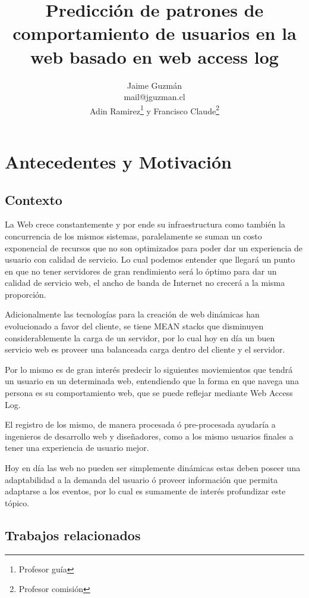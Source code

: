 \documentclass{udparticle}
\title{ Predicción de patrones de comportamiento de usuarios en la web basado en web access log}
\author{  
  Jaime Guzmán\\{\small\ttfamily mail@jguzman.cl}\protect\\[5pt]%
  {\small Adin Ramirez\thanks{Profesor guía} y Francisco Claude\thanks{Profesor comisión}}%
  }
\begin{document}
\maketitle

\section{Antecedentes y Motivación}

\subsection{Contexto}


  La Web crece constantemente y por ende su infraestructura como también la concurrencia de los mismos sistemas, paralelamente se suman un costo exponencial de recursos que no son optimizados para poder dar un experiencia de usuario con calidad de servicio.
  Lo cual podemos entender que llegará un punto en que no tener servidores de gran rendimiento será lo óptimo para dar un calidad de servicio web, el ancho de banda de Internet no crecerá a la misma proporción.


  Adicionalmente las tecnologías para la creación de  web dinámicas han evolucionado a favor del cliente, se tiene MEAN stacks que disminuyen considerablemente la carga de un servidor, por lo cual hoy en día un buen servicio web  es proveer una balanceada carga dentro del cliente y el servidor.

  Por lo mismo es de gran interés predecir lo siguientes moviemientos que tendrá un usuario en un determinada web, entendiendo que la forma en que navega una persona es su comportamiento web, que se puede reflejar mediante Web Access Log.

  El registro de los mismo, de manera procesada ó pre-procesada ayudaría a ingenieros de desarrollo web y diseñadores, como a los mismo usuarios finales a tener una experiencia de usuario mejor.

  Hoy en día las web no pueden ser simplemente dinámicas estas deben poseer una adaptabilidad a la demanda del usuario ó proveer información que permita adaptarse a los eventos, por lo cual es sumamente de interés profundizar este tópico.








 

\subsection{Trabajos relacionados}
\end{document}
